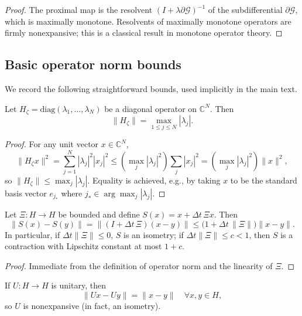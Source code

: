 \documentclass[11pt]{article}
\begin{document}
\begin{proof}
The proximal map is the resolvent $(I + \lambda\partial\mathcal{G})^{-1}$ of the subdifferential $\partial\mathcal{G}$, which is maximally monotone. Resolvents of maximally monotone operators are firmly nonexpansive; this is a classical result in monotone operator theory.
\end{proof}

\subsection{Basic operator norm bounds}

We record the following straightforward bounds, used implicitly in the main text.

\begin{lemma}
Let $H_\zeta = \mathrm{diag}(\lambda_1,\dots,\lambda_N)$ be a diagonal operator on $\mathbb{C}^N$.
Then
\[
  \|H_\zeta\| = \max_{1\le j\le N} |\lambda_j|.
\]
\end{lemma}

\begin{proof}
For any unit vector $x\in\mathbb{C}^N$,
\[
  \|H_\zeta x\|^2
  = \sum_{j=1}^N |\lambda_j|^2 |x_j|^2
  \le \left(\max_j |\lambda_j|^2\right) \sum_j |x_j|^2
  = \left(\max_j |\lambda_j|^2\right)\|x\|^2,
\]
so $\|H_\zeta\|\le \max_j |\lambda_j|$. Equality is achieved, e.g., by taking $x$ to be the standard basis vector $e_{j_*}$ where $j_*\in\arg\max_j |\lambda_j|$.
\end{proof}

\begin{lemma}
Let $\Xi:H\to H$ be bounded and define $S(x)=x+\Delta t\,\Xi x$. Then
\[
  \|S(x)-S(y)\|
  = \|(I + \Delta t\,\Xi)(x-y)\|
  \le \bigl(1 + \Delta t\,\|\Xi\|\bigr)\|x-y\|.
\]
In particular, if $\Delta t\|\Xi\|\le 0$, $S$ is an isometry; if $\Delta t\|\Xi\|\le c<1$, then $S$ is a contraction with Lipschitz constant at most $1+c$.
\end{lemma}

\begin{proof}
Immediate from the definition of operator norm and the linearity of $\Xi$.
\end{proof}

\begin{lemma}
If $U:H\to H$ is unitary, then
\[
  \|Ux - Uy\| = \|x-y\|\quad\forall x,y\in H,
\]
so $U$ is nonexpansive (in fact, an isometry).
\end{lemma}
\end{document}

